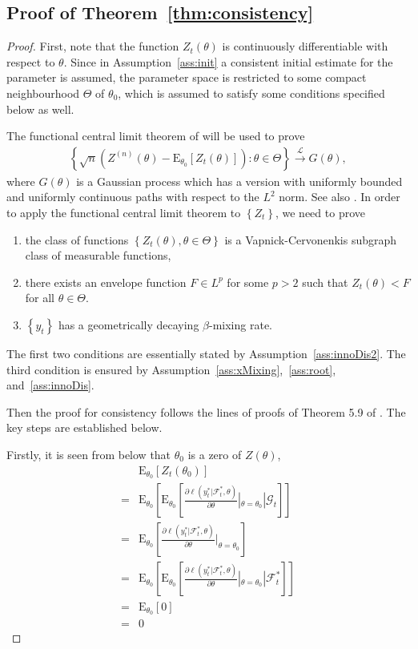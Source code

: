 \documentclass[a4paper,12pt]{article}
\newcommand{\E}{\mathop{\mathbb{E}}}
\def \indist {\stackrel{\mathcal{L}}{\longrightarrow}}
\def \E{\mbox{E}}
\def \F {\mathcal{F}}
\def \G {\mathcal{G}}
\begin{document}
\subsection{Proof of Theorem~\ref{thm:consistency}}
\begin{proof}
First, note that the function $Z_t(\theta)$ is continuously differentiable with respect to $\theta$. 
Since in Assumption~\ref{ass:init} a consistent initial estimate for the parameter is assumed, 
the parameter space is restricted to some compact neighbourhood $\Theta$ of $\theta_0$, which is assumed to satisfy some conditions specified below as well.

The functional central limit theorem of \citet{ArconesYu1994} will be used to prove 
\begin{align*}
\left\{ \sqrt{n}\left( Z^{(n)}(\theta) - \E_{\theta_0}\left[ Z_t(\theta) \right] \right) :\theta\in\Theta\right\} \indist G(\theta),
\end{align*}
where $G(\theta)$ is a Gaussian process which has a version with uniformly bounded and uniformly
continuous paths with respect to the $L^2$ norm. See also \citet{ChanTsay1998}.
In order to apply the functional central limit theorem to $\left\{ Z_t \right\}$, we need to prove 
\begin{enumerate}
\item the class of functions $\left\{ Z_t(\theta),\theta \in \Theta \right\}$ is a
Vapnick-Cervonenkis subgraph class of measurable functions,
\item there exists an envelope function $F\in L^p$ for some $p>2$ such that $Z_t(\theta) < F $ for all $\theta \in \Theta$.
\item $\left\{ y_t \right\}$ has a geometrically decaying $\beta$-mixing rate.
\end{enumerate}
The first two conditions are essentially stated by Assumption~\ref{ass:innoDis2}. The third
condition is ensured by Assumption~\ref{ass:xMixing},~\ref{ass:root}, and~\ref{ass:innoDis}.


Then the proof for consistency follows the lines of proofs of Theorem 5.9 of \citet{vaart}.
The key steps are established below. 


Firstly, it is seen from below that $\theta_0$ is a zero of $Z(\theta)$,
\begin{align*}
&\E_{\theta_0}\left[ Z_t(\theta_0) \right] \\
= &\E_{\theta_0}\left[ \E_{\theta_0}\left[
\frac{\partial \ell(y_t^*|\F^*_t,\theta)}{\partial \theta}|_{\theta=\theta_0}|\G_t
\right] \right] \\
= &\E_{\theta_0}\left[ \frac{\partial \ell(y_t^*|\F^*_t,\theta)}{\partial \theta}|_{\theta=\theta_0}\right]\\
= &\E_{\theta_0}\left[ \E_{\theta_0}\left[ \frac{\partial \ell(y_t^*|\F^*_t,\theta)}{\partial
\theta}|_{\theta=\theta_0}|\F_t^*  \right]\right]\\
= &\E_{\theta_0}\left[ 0\right]\\
= &0
\end{align*}


\end{proof}
\end{document}
